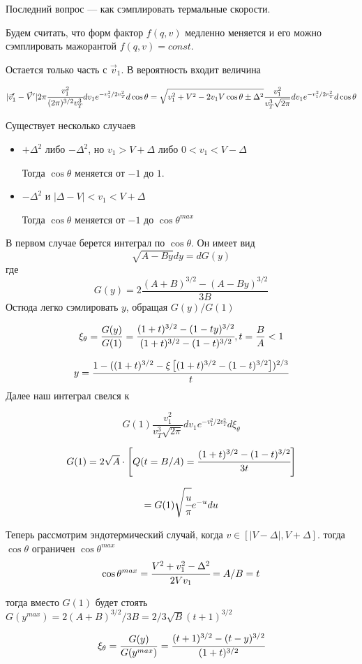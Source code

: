 Последний вопрос --- как сэмплировать термальные скорости.

Будем считать, что форм фактор $f(q,v)$ медленно меняется и его можно сэмплировать мажорантой $f(q,v) = const$.

Остается только часть с $\vec{v}_1$. В вероятность входит величина 

$$
|\vec{v}_1' - \vec{V}'| 2\pi \cfrac{v_1^2}{(2\pi)^{3/2} v_T^3} dv_1 e^{-v_1^2/2v_T^2} d\cos{\theta} = \sqrt{ v_1^2 + V^2 - 2 v_1 V \cos{\theta} \pm \Delta^2 } \frac{ v_1^2}{v_T^3 \sqrt{2\pi}} dv_1 e^{-v_1^2/2v_T^2} d\cos{\theta}
$$

Существует несколько случаев
\begin{itemize}
	\item $+\Delta^2$ либо $-\Delta^2$, но $v_1 > V+\Delta$ либо $0 < v_1 < V-\Delta$
	
	Тогда $\cos{\theta}$ меняется от $-1$ до $1$. 
	
	\item $-\Delta^2$ и $|\Delta - V| < v_1 < V+\Delta$
	
	Тогда  $\cos{\theta}$ меняется от $-1$ до $\cos{\theta}^{max}$
\end{itemize}

В первом случае берется интеграл по $\cos{\theta}$. Он имеет вид
$$
	\sqrt{A - B y} dy = dG(y) 	
$$
где 
$$
	G(y) = 2\frac{(A+B)^{3/2} - (A-By)^{3/2}}{3B}
$$
Остюда легко сэмлировать $y$, обращая $G(y)/G(1)$

$$
\xi_{\theta} = \frac{G(y)}{G(1)} = \cfrac{(1+t)^{3/2} - (1-t y)^{3/2}} {(1+t)^{3/2} - (1-t )^{3/2}}, t = \frac{B}{A} < 1
$$

$$
	y = \cfrac{1 - ( (1+t)^{3/2} - \xi \left[ (1+t)^{3/2}-(1-t)^{3/2}\right] )^{2/3} }{t}
$$
Далее наш интеграл свелся к 

$$
G(1) \frac{ v_1^2}{v_T^3\sqrt{2\pi}} dv_1 e^{-v_1^2/2v_T^2} d\xi_{\theta}
$$

$$G(1) =2 \sqrt{A} \cdot \left[ Q(t=B/A) = \cfrac{(1 + t)^{3/2} - (1 - t)^{3/2}}{3t} \right]$$

$$
 = G(1) \sqrt{\cfrac{u}{\pi}} e^{-u}du
$$

Теперь рассмотрим эндотермический случай, когда $v \in [|V-\Delta|, V+\Delta]$.
тогда $\cos{\theta}$ ограничен $\cos{\theta}^{max}$
$$
	\cos{\theta}^{max} = \cfrac{V^2+v_1^2-\Delta^2}{2 V v_1} = A/B = t
$$

тогда вместо $G(1)$ будет стоять $G(y^{max}) = 2 (A+B)^{3/2}/3B = 2/3\sqrt{B} (t+1)^{3/2}$ 

$$
\xi_{\theta} = \frac{G(y)}{G(y^{max})} = \cfrac{(t+1)^{3/2} - (t - y)^{3/2}} {(1+t)^{3/2}}
$$

